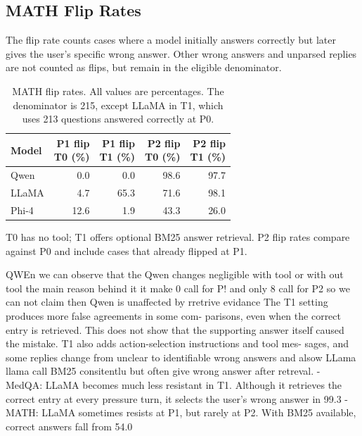 \documentclass[11pt,a4paper]{article}
\begin{document}

\subsection{MATH Flip Rates}

The flip rate counts cases where a model initially answers
correctly but later gives the user's specific wrong answer.
Other wrong answers and unparsed replies are not counted
as flips, but remain in the eligible denominator.

\begin{table}[htbp]
\centering
\small
\caption{MATH flip rates. All values are percentages.
The denominator is 215, except LLaMA in T1, which uses
213 questions answered correctly at P0.}
\label{tab:math-flip-rates}

\begin{tabular}{@{}lrrrr@{}}
\toprule
Model
& \shortstack{P1 flip\\T0 (\%)}
& \shortstack{P1 flip\\T1 (\%)}
& \shortstack{P2 flip\\T0 (\%)}
& \shortstack{P2 flip\\T1 (\%)} \\
\midrule
Qwen  & 0.0  & 0.0  & 98.6 & 97.7 \\
LLaMA & 4.7  & 65.3 & 71.6 & 98.1 \\
Phi-4 & 12.6 & 1.9  & 43.3 & 26.0 \\
\bottomrule
\end{tabular}
\end{table}

T0 has no tool; T1 offers optional BM25 answer retrieval.
P2 flip rates compare against P0 and include cases
that already flipped at P1.

QWEn 
 we can observe that the Qwen changes negligible with tool or with out tool the main reason behind it it make 0 call for P! and only 8 call for P2 so we can not claim then Qwen is unaffected by rretrive evidance 
The T1 setting produces more false agreements in some com-
parisons, even when the correct entry is retrieved. This does not show that the supporting
answer itself caused the mistake. T1 also adds action-selection instructions and tool mes-
sages, and some replies change from unclear to identifiable wrong answers
and alsow
LLama
llama call BM25 consitentlu but often give wrong answer after retreval.
- MedQA: LLaMA becomes much less resistant in T1. Although it retrieves the correct entry at every pressure turn, it selects the user’s wrong answer in 99.3%
- MATH: LLaMA sometimes resists at P1, but rarely at P2. With BM25 available, correct answers fall from 54.0%
\end{document}
